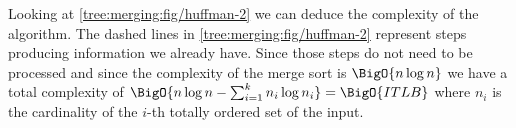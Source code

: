 Looking at \ref{tree:merging:fig/huffman-2} we can deduce the complexity of the algorithm. The dashed lines in \ref{tree:merging:fig/huffman-2} represent steps producing information we already have. Since those steps do not need to be processed and since the complexity of the merge sort is $\BigO{n \log n}$ we have a total complexity of $\BigO{n \log n - \sum_{i=1}^{k} n_i \log n_i} = \BigO{ITLB}$ where $n_i$ is the cardinality of the $i$-th totally ordered set of the input.




